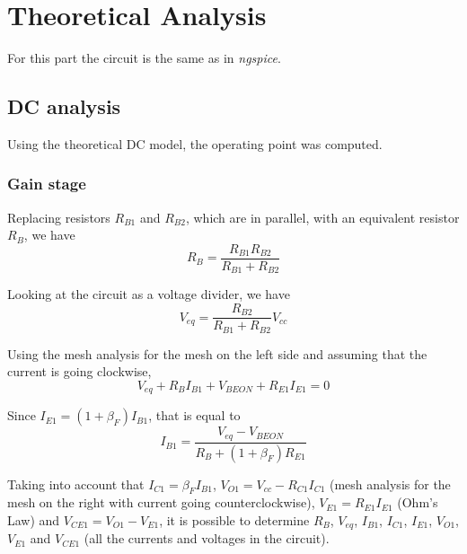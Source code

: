 \section{Theoretical Analysis}
\label{sec:analysis}



For this part the circuit is the same as in \textit{ngspice}.

\subsection{DC analysis}
Using the theoretical DC model, the operating point was computed.


\subsubsection{Gain stage}
Replacing resistors $R_{B1}$ and $R_{B2}$, which are in parallel, with an equivalent resistor $R_{B}$, we have
\begin{equation}
R_B = \frac{R_{B1} R_{B2}}{R_{B1}+R_{B2}}
\end{equation}

Looking at the circuit as a voltage divider, we have
\begin{equation}
V_{eq} = \frac{R_{B2}}{R_{B1}+R_{B2}} V_{cc}
\end{equation}

Using the mesh analysis for the mesh on the left side and assuming that the current is going clockwise,
\begin{equation}
V_{eq} + R_B I_{B1} + V_{BEON} + R_{E1} I_{E1} = 0
\end{equation}

Since $I_{E1} = (1 + \beta_F) I_{B1}$, that is equal to 
\begin{equation}
I_{B1} = \frac{V_{eq}-V_{BEON}}{R_B + (1+\beta_F) R_{E1}}
\end{equation}

Taking into account that $I_{C1} = \beta_F I_{B1}$, $V_{O1} = V_{cc} - R_{C1} I_{C1}$ (mesh analysis for the mesh on the right with current going counterclockwise), $V_{E1} = R_{E1} I_{E1}$ (Ohm's Law) and $V_{CE1} = V_{O1} - V_{E1}$, it is possible to determine $R_B$, $V_{eq}$, $I_{B1}$, $I_{C1}$, $I_{E1}$, $V_{O1}$, $V_{E1}$ and $V_{CE1}$ (all the currents and voltages in the circuit).




